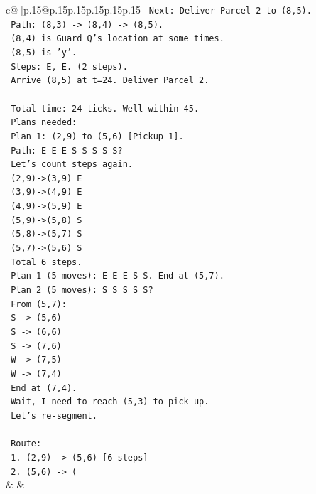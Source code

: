 \documentclass{article}
\begin{document}
{\begin{supertabular}{c@{$\;$}|p{.15\linewidth}@{}p{.15\linewidth}p{.15\linewidth}p{.15\linewidth}p{.15\linewidth}p{.15\linewidth}}
{{{\texttt{   Next: Deliver Parcel 2 to (8,5).} \\
\texttt{   Path: (8,3) {-}> (8,4) {-}> (8,5).} \\
\texttt{   (8,4) is Guard Q's location at some times.} \\
\texttt{   (8,5) is 'y'.} \\
\texttt{   Steps: E, E. (2 steps).} \\
\texttt{   Arrive (8,5) at t=24. Deliver Parcel 2.} \\
\\ 
\texttt{   Total time: 24 ticks. Well within 45.} \\
\texttt{   Plans needed:} \\
\texttt{   Plan 1: (2,9) to (5,6) {[}Pickup 1{]}.} \\
\texttt{     Path: E E E S S S S S?} \\
\texttt{     Let's count steps again.} \\
\texttt{     (2,9){-}>(3,9) E} \\
\texttt{     (3,9){-}>(4,9) E} \\
\texttt{     (4,9){-}>(5,9) E} \\
\texttt{     (5,9){-}>(5,8) S} \\
\texttt{     (5,8){-}>(5,7) S} \\
\texttt{     (5,7){-}>(5,6) S} \\
\texttt{     Total 6 steps.} \\
\texttt{     Plan 1 (5 moves): E E E S S. End at (5,7).} \\
\texttt{   Plan 2 (5 moves): S S S S S?} \\
\texttt{     From (5,7):} \\
\texttt{     S {-}> (5,6)} \\
\texttt{     S {-}> (6,6)} \\
\texttt{     S {-}> (7,6)} \\
\texttt{     W {-}> (7,5)} \\
\texttt{     W {-}> (7,4)} \\
\texttt{     End at (7,4).} \\
\texttt{     Wait, I need to reach (5,3) to pick up.} \\
\texttt{     Let's re{-}segment.} \\
\\ 
\texttt{     Route:} \\
\texttt{     1. (2,9) {-}> (5,6) {[}6 steps{]}} \\
\texttt{     2. (5,6) {-}> (} \\
            }
        }
    }
    & & \\ \\


\end{supertabular}}
\end{document}
